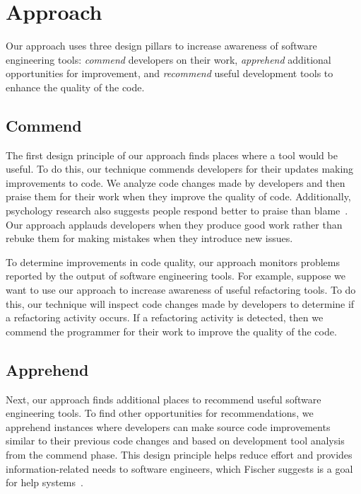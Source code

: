 \documentclass[sigconf,review,anonymous]{acmart}
\newcommand{\tool}{\textsl{tool-recommender-bot}}
\begin{document}
\section{Approach}

Our approach uses three design pillars to increase awareness of software engineering tools: \textit{commend} developers on their work, \textit{apprehend} additional opportunities for improvement, and \textit{recommend} useful development tools to enhance the quality of the code.

\subsection{Commend}

The first design principle of our approach finds places where a tool would be useful. To do this, our technique commends developers for their updates making improvements to code. We analyze code changes made by developers and then praise them for their work when they improve the quality of code. Additionally, psychology research also suggests people respond better to praise than blame~\cite{PraiseAndBlame}. Our approach applauds developers when they produce good work rather than rebuke them for making mistakes when they introduce new issues. 

To determine improvements in code quality, our approach monitors problems reported by the output of software engineering tools. For example, suppose we want to use our approach to increase awareness of useful refactoring tools. To do this, our technique will inspect code changes made by developers to determine if a refactoring activity occurs. If a refactoring activity is detected, then we commend the programmer for their work to improve the quality of the code.


\subsection{Apprehend}

Next, our approach finds additional places to recommend useful software engineering tools. To find other opportunities for recommendations, we apprehend instances where developers can make source code improvements similar to their previous code changes and based on development tool analysis from the commend phase. This design principle helps reduce effort and provides information-related needs to software engineers, which Fischer suggests is a goal for help systems~\cite{Fischer1984ActiveHelpSystems}. 
\end{document}
